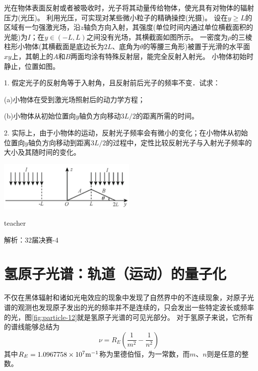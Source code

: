 \begin{example}
光在物体表面反射或者被吸收时，光子将其动量传给物体，使光具有对物体的辐射压力(光压)。
利用光压，可实现对某些微小粒子的精确操控(光摄)。
设在$y\ge L$的区域有一匀强激光场，沿$z$轴负方向入射，其强度(单位时间内通过单位横截面积的光能)为$I$；在$y\in (-L,L)$之间没有光场，其横截面如图所示。
一密度为$\rho$的三棱柱形小物体(其横截面是底边长为$2L$、底角为$\theta$的等腰三角形)被置于光滑的水平面$xy$上，其朝上的$A$和$B$两面均涂有特殊反射层，能完全反射入射光。
小物体初始时静止，位置如图。

1. 假定光子的反射角等于入射角，且反射前后光子的频率不变．试求：

(a)小物体在受到激光场照射后的动力学方程；

(b)小物体从初始位置向$y$轴负方向移动$3L/2$的距离所需的时间。

2. 实际上，由于小物体的运动，反射光子频率会有微小的变化；在小物体从初始位置向$y$轴负方向移动到距离$3L/2$的过程中，定性比较反射光子与入射光子频率的大小及其随时间的变化。
\begin{flushright}
\includegraphics[width = 0.5\textwidth]{images/particle-3.pdf} 
\end{flushright}


\begin{taggedblock}{teacher}

解析：32届决赛-4
\end{taggedblock}
\end{example}




\section{氢原子光谱：轨道（运动）的量子化}
不仅在黑体辐射和诸如光电效应的现象中发现了自然界中的不连续现象，对原子光谱的观测也发现原子发出的光的频率并不是连续的，只会发出一些特定波长或频率的光，图\ref{fig:particle-12}就是氢原子光谱的可见光部分。
对于氢原子来说，它所有的谱线能够总结为
\begin{equation}
\nu = R_E(\frac{1}{m^2}-\frac{1}{n^2})
\end{equation}
其中$R_E = 1.0967758\times 10^{7}{\rm{m^{-1}}}$称为里德伯恒，为一常数，而$m$、$n$则是任意的整数。


